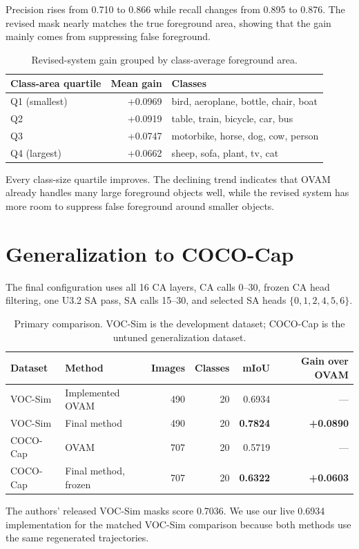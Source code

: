 \documentclass[10pt,a4paper]{article}
\begin{document}
Precision rises from 0.710 to 0.866 while recall changes from 0.895 to 0.876.
The revised mask nearly matches the true foreground area, showing that the
gain mainly comes from suppressing false foreground.

\begin{table}[H]\centering\small
\begin{tabular}{lrl}
\toprule
Class-area quartile & Mean gain & Classes \\
\midrule
Q1 (smallest) & +0.0969 & bird, aeroplane, bottle, chair, boat \\
Q2 & +0.0919 & table, train, bicycle, car, bus \\
Q3 & +0.0747 & motorbike, horse, dog, cow, person \\
Q4 (largest) & +0.0662 & sheep, sofa, plant, tv, cat \\
\bottomrule
\end{tabular}
\caption{Revised-system gain grouped by class-average foreground area.}
\end{table}

Every class-size quartile improves.  The declining trend indicates that OVAM
already handles many large foreground objects well, while the revised system
has more room to suppress false foreground around smaller objects.

\section{Generalization to COCO-Cap}

The final configuration uses all 16 CA layers, CA calls 0--30, frozen CA head
filtering, one U3.2 SA pass, SA calls 15--30, and selected SA heads
$\{0,1,2,4,5,6\}$.

\begin{table}[H]\centering
\begin{tabular}{llrrrr}
\toprule
Dataset & Method & Images & Classes & mIoU & Gain over OVAM \\
\midrule
VOC-Sim & Implemented OVAM & 490 & 20 & 0.6934 & --- \\
VOC-Sim & Final method & 490 & 20 & \textbf{0.7824} & \textbf{+0.0890} \\
\addlinespace
COCO-Cap & OVAM & 707 & 20 & 0.5719 & --- \\
COCO-Cap & Final method, frozen & 707 & 20 & \textbf{0.6322} & \textbf{+0.0603} \\
\bottomrule
\end{tabular}
\caption{Primary comparison.  VOC-Sim is the development dataset; COCO-Cap is
the untuned generalization dataset.}
\end{table}

The authors' released VOC-Sim masks score 0.7036.  We use our live 0.6934
implementation for the matched VOC-Sim comparison because both methods use the
same regenerated trajectories.
\end{document}
